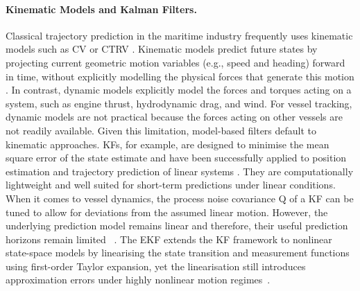 \paragraph{Kinematic Models and Kalman Filters.} 
Classical trajectory prediction in the maritime industry frequently uses %
kinematic models such as \ac{CV} or \ac{CTRV} \parencite{li2003survey}.
Kinematic models predict future states by projecting current geometric motion variables (e.g., speed and heading) forward in time, without explicitly modelling the physical forces that generate this motion \parencite{li2003survey}. %
In contrast, dynamic models explicitly model the forces and torques acting on a system, such as engine thrust, hydrodynamic drag, and wind. 
For vessel tracking, dynamic models are not practical because the forces acting on other vessels are not readily available.
Given this limitation, model-based filters default to kinematic approaches.
\acp{KF}, for example, are designed to minimise the mean square error of the state estimate and have been successfully applied to position estimation and trajectory prediction of linear systems \parencite{kfreview}.
They are computationally lightweight and well suited for short-term predictions under linear conditions.
When it comes to 
vessel dynamics, the process noise covariance Q of a \ac{KF} can be tuned to allow for deviations from the assumed linear motion. However, the underlying prediction model remains linear and therefore, their useful prediction horizons remain limited ~\parencite{donandt2022shortterm}. %
The \ac{EKF} extends the \ac{KF} framework to nonlinear state-space models 
by linearising the state transition and measurement functions using first-order Taylor expansion, yet the linearisation still introduces approximation errors under highly nonlinear motion regimes~\parencite{kfreview}.
